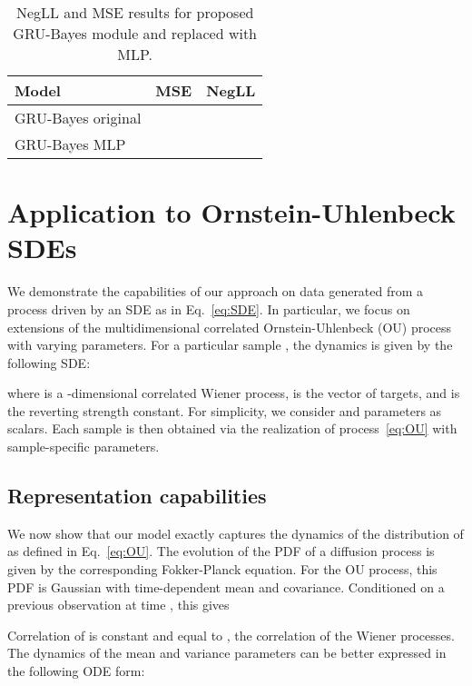 \documentclass{article}
\begin{document}
\begin{table*}[h]
\caption{NegLL and MSE results for proposed GRU-Bayes module and replaced with MLP.}
\label{table:ablationGRUBayes}
\vskip 0.15in
\begin{center}
\begin{small}
\begin{sc}
\begin{tabular}{lcc}
\toprule
Model & MSE & NegLL  \\
\midrule
GRU-Bayes original &  &   \\
GRU-Bayes MLP &    &   \\


\bottomrule
\end{tabular}
\end{sc}
\end{small}
\end{center}
\vskip -0.1in
\end{table*}



\section{Application to Ornstein-Uhlenbeck SDEs}
\label{app:OU_SDE}
We demonstrate the capabilities of our approach on data generated from a process driven by an SDE as in Eq.~\ref{eq:SDE}. In particular, we focus on extensions of the multidimensional correlated Ornstein-Uhlenbeck (OU) process with varying parameters. For a particular sample , the dynamics is given by the following SDE:

where  is a -dimensional correlated Wiener process,  is the vector of targets, and  is the reverting strength constant. For simplicity, we consider  and  parameters as scalars. Each sample  is then obtained via the realization of process~\eqref{eq:OU} with sample-specific parameters.

\subsection{Representation capabilities}
\label{sec:representation-capabilities}
We now show that our model exactly captures the dynamics of the distribution of  as defined in Eq.~\ref{eq:OU}. The evolution of the PDF of a diffusion process is given by the corresponding Fokker-Planck equation. For the OU process, this PDF is Gaussian with time-dependent mean and covariance. Conditioned on a previous observation at time , this gives

Correlation of  is constant and equal to , the correlation of the Wiener processes. The dynamics of the mean and variance parameters can be better expressed in the following ODE form:
\end{document}
